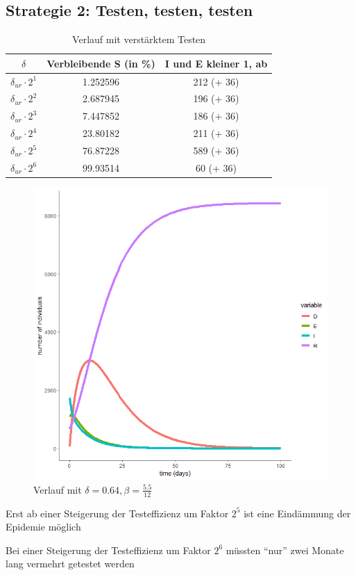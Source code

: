 \documentclass{scrartcl}
\begin{document}
\subsection{Strategie 2: Testen, testen, testen}
	\begin{table}[h]
		\caption{Verlauf mit verstärktem Testen}
		\centering
		\begin{tabular}{@{}ccc@{}}
			\toprule
			$\delta$ & Verbleibende S (in \%) & I und E kleiner 1, ab\\ 
			\midrule
			 $\delta_{ur} \cdot 2^1$ & 1.252596 & 212 (+ 36) \\ 
			 $\delta_{ur} \cdot 2^2$ & 2.687945 & 196 (+ 36)\\  
			 $\delta_{ur} \cdot 2^3$ & 7.447852 & 186 (+ 36)\\ 
			 $\delta_{ur} \cdot 2^4$ & 23.80182 & 211 (+ 36)\\ 
			 $\delta_{ur} \cdot 2^5$ & 76.87228 & 589 (+ 36)\\ 
			 $\delta_{ur} \cdot 2^6$ & 99.93514 & 60 (+ 36)\\ 
			\bottomrule
		\end{tabular}
	\end{table}
	\begin{figure}[h]
        	\centering
		\includegraphics[scale=0.5]{delta=0,64,beta_unveraendert,ohne_s.png}
		\caption{Verlauf mit $\delta = 0.64, \beta = \frac{5.5}{12}$}
	\end{figure}	
	\begin{arrowlist}
		\item Erst ab einer Steigerung der Testeffizienz um Faktor $2^5$ ist eine Eindämmung der Epidemie möglich
		\item Bei einer Steigerung der Testeffizienz um Faktor $2^6$ müssten \enquote{nur} zwei Monate lang vermehrt getestet werden
	\end{arrowlist}
\end{document}
